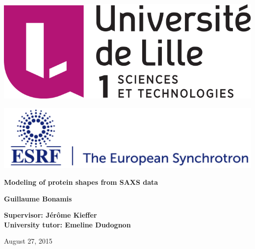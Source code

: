 \documentclass[a4paper, 11pt]{report}
\begin{document}
\begin{titlepage}
    \parindent=0pt

    \begin{minipage}{\linewidth}
        \begin{center}
        \includegraphics[scale=0.28]{logo-lille1-2014.png}
        \end{center}
    \end{minipage}

    \vspace{0.4cm}

    \begin{minipage}{\linewidth}
        \begin{center}
        \includegraphics[scale=0.28]{ESRF_logo.png}
        \end{center}
    \end{minipage}

    \vspace{0.4cm}

    \hrulefill
    \begin{center}\bfseries\Huge
        Modeling of protein shapes from SAXS data
    \end{center}

    \hrulefill
    \vspace*{1cm}
    \begin{center}\bfseries\Large           %
        Guillaume Bonamis
    \end{center}

    \begin{center}\bfseries\Large           %
        Supervisor: J\'er\^ome Kieffer\\
        University tutor: Emeline Dudognon
    \end{center}

    \begin{flushright}
        August 27, 2015
    \end{flushright}   
    
\end{titlepage}
\end{document}

